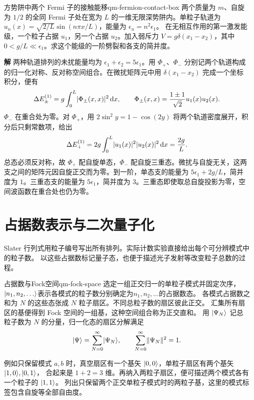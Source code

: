 \begin{example}{方势阱中两个 Fermi 子的接触能移}{qm-fermion-contact-box}
    两个质量为 $m$、自旋为 $1/2$ 的全同 Fermi 子处在宽为 $L$ 的一维无限深势阱内。单粒子轨道为 $u_n(x) = \sqrt{2/L}\sin(n\pi x/L)$，能量为 $\epsilon_n = n^2\epsilon_1$。
    在无相互作用的第一激发能级，一个粒子占据 $u_1$，另一个占据 $u_2$。加入弱斥力 $V = g\delta(x_1 - x_2)$，其中 $0 < g/L \ll \epsilon_1$。求这个能级的一阶劈裂和各支的简并度。
    \par\smallskip\textbf{解}\quad
    两种轨道排列的未扰能量均为 $\epsilon_1 + \epsilon_2 = 5\epsilon_1$。用 $\Phi_+$、$\Phi_-$ 分别记两个轨道构成的归一化对称、反对称空间组合。在微扰矩阵元中用 $\delta(x_1 - x_2)$ 完成一个坐标积分，便有
    \[
        \Delta E_\pm^{(1)} = g\int_0^L \lvert\Phi_\pm(x,x)\rvert^2 \mathop{}\!\mathrm{d} x ,
        \qquad \Phi_\pm(x,x) = \frac{1 \pm 1}{\sqrt{2}}u_1(x)u_2(x).
    \]
    $\Phi_-$ 在重合处为零。对 $\Phi_+$，用 $2\sin^2 y = 1 - \cos(2y)$ 将两个轨道密度展开，积分后只剩常数项，给出
    \[
        \Delta E_+^{(1)} = 2g\int_0^L \lvert u_1(x)\rvert^2\lvert u_2(x)\rvert^2 \mathop{}\!\mathrm{d} x = \frac{2g}{L}.
    \]
    总态必须反对称，故 $\Phi_+$ 配自旋单态，$\Phi_-$ 配自旋三重态。微扰与自旋无关，这两支之间的矩阵元因自旋正交而为零。到一阶，单态支的能量为 $5\epsilon_1 + 2g/L$，简并度为 $1$。三重态支的能量为 $5\epsilon_1$，简并度为 $3$。三重态即使取总自旋投影为零，空间波函数在重合处也仍为零。
\end{example}

\section{占据数表示与二次量子化}
Slater 行列式用粒子编号写出所有排列。实际计数实验直接给出每个可分辨模式中的粒子数。
以这些占据数标记量子态，也便于描述光子发射等改变粒子总数的过程。

\begin{definition}{占据数与Fock空间}{qm-fock-space}
    选定一组正交归一的单粒子模式并固定次序，$\lvert n_1,n_2,\ldots\rangle$表示各模式的粒子数分别确定为$n_1,n_2,\ldots$的占据数态。
    各模式占据数之和为 $N$ 的这些态张成 $N$ 粒子扇区。不同总粒子数的扇区彼此正交。
    汇集所有扇区的基便得到 Fock 空间的一组基，这种空间组合称为正交直和。
    用 $\lvert\Psi_N\rangle$ 记总粒子数为 $N$ 的分量，归一化态的扇区分解满足
    \begin{equation}
        \lvert\Psi\rangle = \sum_{N=0}^\infty\lvert\Psi_N\rangle,\qquad
        \sum_{N=0}^\infty\lVert\Psi_N\rVert^2 = 1.
    \end{equation}
\end{definition}
例如只保留模式 $a,b$ 时，真空扇区有一个基矢 $\lvert0,0\rangle$，单粒子扇区有两个基矢 $\lvert1,0\rangle,\lvert0,1\rangle$，
合起来是 $1 + 2 = 3$ 维。再纳入两粒子扇区，便可描述两个模式各有一个粒子的 $\lvert1,1\rangle$。
列出只保留两个正交单粒子模式时的两粒子基，这里的模式标签包含自旋等全部自由度。

